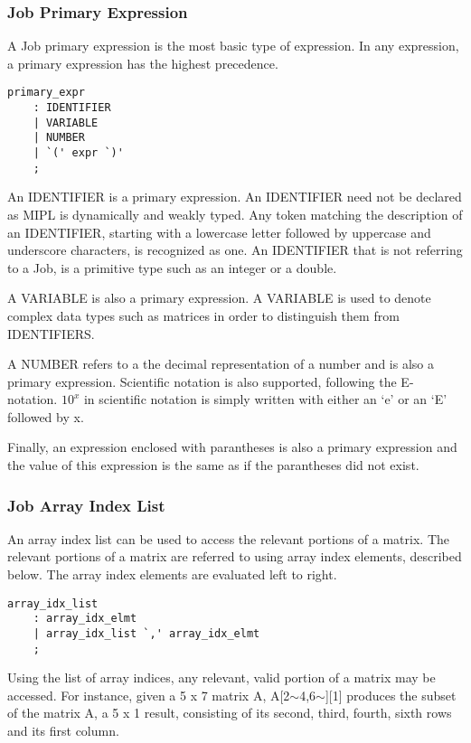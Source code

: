 \documentclass[prodmode,acmtecs]{acmsmall}
\begin{document}
\subsubsection{Job Primary Expression}

A Job primary expression is the most basic type of expression. In any
expression, a primary expression has the highest precedence.

\begin{lstlisting}
primary_expr
	: IDENTIFIER
	| VARIABLE
	| NUMBER
	| `(' expr `)'
	;
\end{lstlisting}

An IDENTIFIER is a primary expression. An IDENTIFIER need not be declared
as MIPL is dynamically and weakly typed. Any token matching the description
of an IDENTIFIER, starting with a lowercase letter followed by uppercase and
underscore characters, is recognized as one. An IDENTIFIER that is not 
referring to a Job, is a primitive type such as an integer or a double.

A VARIABLE is also a primary expression. A VARIABLE is used to denote complex 
data types such as matrices in order to distinguish them from IDENTIFIERS.

A NUMBER refers to a the decimal representation of a number and is also a 
primary expression. Scientific notation is also supported, following the 
E-notation. $10^{x}$ in scientific notation is simply written with either an
`e' or an `E' followed by x.

Finally, an expression enclosed with parantheses is also a primary expression 
and the value of this expression is the same as if the parantheses did not 
exist.

\subsubsection{Job Array Index List}

An array index list can be used to access the relevant portions of a matrix. 
The relevant portions of a matrix are referred to using array index elements, 
described below. The array index elements are evaluated left to right.

\begin{lstlisting}
array_idx_list
	: array_idx_elmt
	| array_idx_list `,' array_idx_elmt
	;
\end{lstlisting}

Using the list of array indices, any relevant, valid portion of a matrix may
be accessed. For instance, given a 5 x 7 matrix A, A[2$\sim$4,6$\sim$][1] produces the
subset of the matrix A, a 5 x 1 result, consisting of its second, third, 
fourth, sixth rows and its first column.
\end{document}

